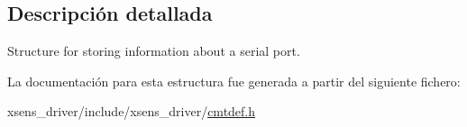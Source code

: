 \subsection{\-Descripción detallada}
\-Structure for storing information about a serial port. 

\-La documentación para esta estructura fue generada a partir del siguiente fichero\-:\begin{DoxyCompactItemize}
\item 
xsens\-\_\-driver/include/xsens\-\_\-driver/\hyperlink{cmtdef_8h}{cmtdef.\-h}\end{DoxyCompactItemize}
